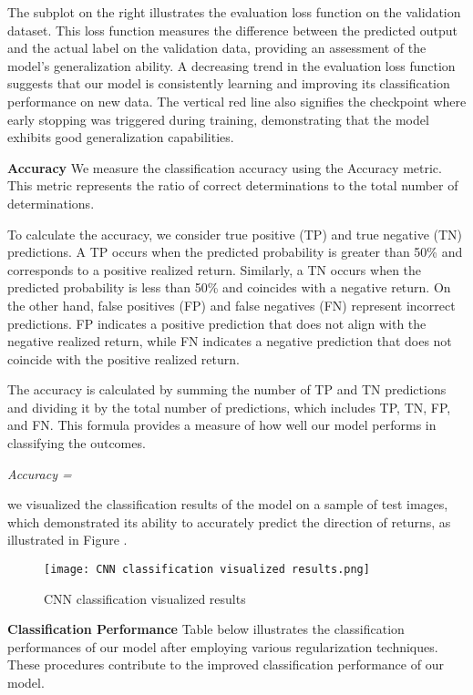 \documentclass{article}
\begin{document}
{The subplot on the right illustrates the evaluation loss function on the validation dataset. This loss function measures the difference between the predicted output and the actual label on the validation data, providing an assessment of the model's generalization ability. A decreasing trend in the evaluation loss function suggests that our model is consistently learning and improving its classification performance on new data. The vertical red line also signifies the checkpoint where early stopping was triggered during training, demonstrating that the model exhibits good generalization capabilities.

	
\textbullet \textbf{Accuracy}
We measure the classification accuracy using the Accuracy metric. This metric represents the ratio of correct determinations to the total number of determinations.

To calculate the accuracy, we consider true positive (TP) and true negative (TN) predictions. A TP occurs when the predicted probability is greater than 50\% and corresponds to a positive realized return. Similarly, a TN occurs when the predicted probability is less than 50\% and coincides with a negative return. On the other hand, false positives (FP) and false negatives (FN) represent incorrect predictions. FP indicates a positive prediction that does not align with the negative realized return, while FN indicates a negative prediction that does not coincide with the positive realized return.

The accuracy is calculated by summing the number of TP and TN predictions and dividing it by the total number of predictions, which includes TP, TN, FP, and FN. This formula provides a measure of how well our model performs in classifying the outcomes.

\emph{Accuracy = }

we visualized the classification results of the model on a sample of test images, which demonstrated its ability to accurately predict the direction of returns, as illustrated in Figure .

\begin{figure}[H]
	\centering
	\texttt{[image: CNN classification visualized results.png]}
	\caption{CNN classification visualized results}
\end{figure}


\textbullet \textbf{Classification Performance}
Table below illustrates the classification performances of our model after employing various regularization techniques. These procedures contribute to the improved classification performance of our model. 


}
\end{document}
